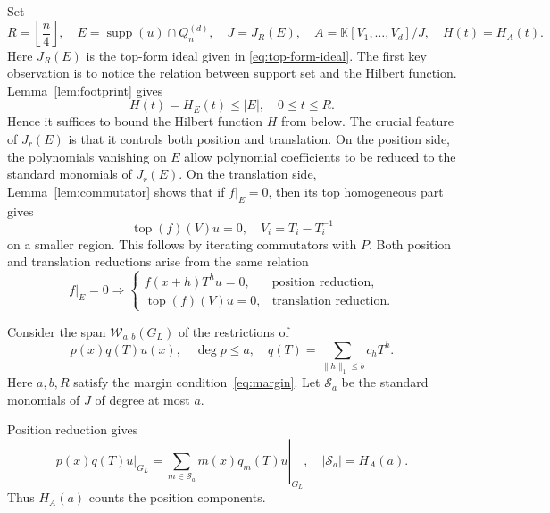 \documentclass[11pt,reqno]{amsart}
\newcommand\K{\ensuremath{\mathbb{K}}}
\newcommand{\supp}{\operatorname{supp}}
\theoremstyle{definition}
\theoremstyle{plain}
\numberwithin{equation}{section}
\begin{document}
Set
\begin{equation*}
    R=\left\lfloor\frac n4\right\rfloor,\quad
    E=\supp(u)\cap Q_n^{(d)},\quad
    J=J_R(E),\quad
    A=\K[V_1,\ldots,V_d]/J,\quad
    H(t)=H_A(t).
\end{equation*}
Here $J_R(E)$ is the top-form ideal given in \eqref{eq:top-form-ideal}.
The first key observation is to notice the relation between support set and the Hilbert function. Lemma~\ref{lem:footprint} gives
\begin{equation*}
    H(t)=H_E(t)\leq |E|,\quad 0\leq t\leq R.
\end{equation*}
Hence it suffices to bound the Hilbert function $H$ from below. The crucial feature of $J_r(E)$ is that it controls both position and translation. On the position side, the polynomials vanishing on $E$ allow polynomial coefficients to be reduced to the standard monomials of $J_r(E)$. On the translation side, Lemma~\ref{lem:commutator} shows that if $f|_E=0$, then its top homogeneous part gives
\begin{equation*}
    \operatorname{top}(f)(V)u=0,
    \quad
    V_i=T_i-T_i^{-1}
\end{equation*}
on a smaller region. This follows by iterating commutators with $P$. Both position and translation reductions arise from the same relation
\begin{equation*}
    f|_E=0
    \Longrightarrow
    \begin{cases}
        f(x+h)T^hu=0,
        & \text{position reduction},\\
        \operatorname{top}(f)(V)u=0,
        & \text{translation reduction}.
    \end{cases}
\end{equation*}

Consider the span $\mathcal W_{a,b}(G_L)$ of the restrictions of
\begin{equation*}
    p(x)q(T)u(x),\quad
    \deg p\leq a,\quad
    q(T)=\sum_{\lVert h\rVert_1\leq b}c_hT^h.
\end{equation*}
Here $a,b,R$ satisfy the margin condition~\eqref{eq:margin}.
Let $\mathcal S_a$ be the standard monomials of $J$ of degree at
most $a$. 

Position reduction gives
\begin{equation*}
    \left.p(x)q(T)u\right|_{G_L}
    =
    \left.
    \sum_{m\in\mathcal S_a}m(x)q_m(T)u
    \right|_{G_L},
    \quad
    |\mathcal S_a|=H_A(a).
\end{equation*}
Thus $H_A(a)$ counts the position components.
\end{document}
